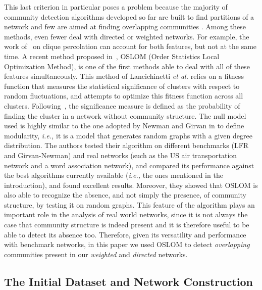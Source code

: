 \documentclass[10pt,letterpaper]{article}
\begin{document}
This last criterion in particular poses a problem because the majority of community detection algorithms developed so far are built to find partitions of a network and few are aimed at finding overlapping communities \cite{Aicher26062014,BaumesGKMP05,PalEtAl05,ZhaWanZha07,Gre07,PhysRevE.77.016107,Lancichinetti2009,PhysRevE.80.016105,Kovacs2010}. Among these methods, even fewer deal with directed or weighted networks. For example, the work of~\cite{PalEtAl05} on clique percolation can account for both features, but not at the same time. A recent method proposed in~\cite{LancichinettiPlos}, OSLOM (Order Statistics Local Optimization Method), is one of the first methods  able to deal with all of these features simultaneously. This method of Lancichinetti \emph{et al.} relies on a fitness function that measures the statistical significance of clusters with respect to random fluctuations, and attempts to optimize this fitness function across all clusters. 
Following~\cite{LancichinettiPlos}, the significance measure is defined as the probability of finding the cluster in a network without community structure. The null model used is highly similar to the one adopted by Newman and Girvan in \cite{newman2004finding} to define modularity, {\it i.e.,} it is a model that generates random graphs with a given degree distribution. The authors tested their algorithm on different benchmarks (LFR and Girvan-Newman) and real networks (such as the US air transportation network and a word association network), and compared its performance against the best algorithms
currently available ({\it i.e.,} the ones mentioned in the introduction), and found excellent results. Moreover, they showed that OSLOM is also able to recognize the absence, and not simply the presence, of community structure, by testing it on random graphs. This feature of the algorithm plays an important role in the analysis of real world networks, since it is not always the case that community structure is indeed present and it is therefore useful to be able to detect its absence too. 
Therefore, given its versatility and performance with benchmark networks, in this paper we used OSLOM to detect \emph{overlapping} communities present in our \emph{weighted} and \emph{directed} networks.

\subsection{The Initial Dataset and Network Construction}
\end{document}
